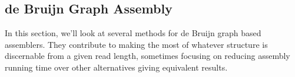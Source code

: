 \documentclass[doctor]{thesis}
\begin{document}





\subsection{de Bruijn Graph Assembly} 
In this section, we'll look at several methods for de Bruijn graph based assemblers.  They contribute to making the most of whatever structure is discernable from a given read length, sometimes focusing on reducing assembly running time over other alternatives giving equivalent results.  


\end{document}
